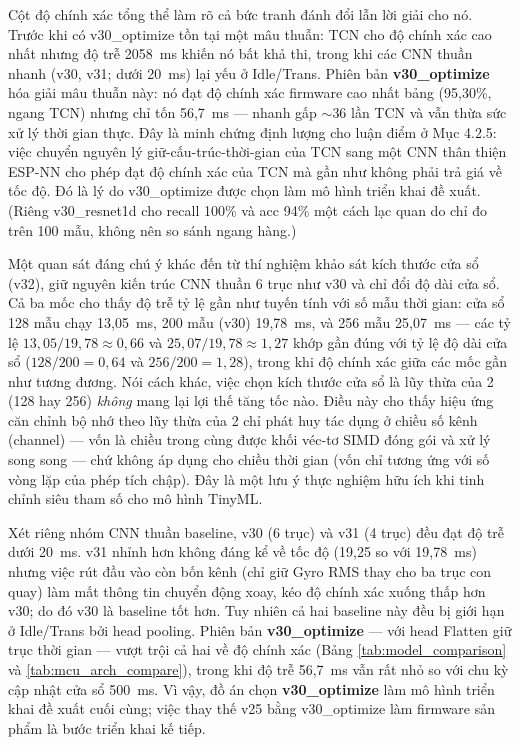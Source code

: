\documentclass[../DoAn.tex]{subfiles}
\begin{document}
Cột độ chính xác tổng thể làm rõ cả bức tranh đánh đổi lẫn lời giải cho nó. Trước khi có v30\_optimize tồn tại một mâu thuẫn: TCN cho độ chính xác cao nhất nhưng độ trễ 2058~ms khiến nó bất khả thi, trong khi các CNN thuần nhanh (v30, v31; dưới 20~ms) lại yếu ở Idle/Trans. Phiên bản \textbf{v30\_optimize} hóa giải mâu thuẫn này: nó đạt độ chính xác firmware cao nhất bảng (95,30\%, ngang TCN) nhưng chỉ tốn 56,7~ms --- nhanh gấp $\sim$36 lần TCN và vẫn thừa sức xử lý thời gian thực. Đây là minh chứng định lượng cho luận điểm ở Mục 4.2.5: việc chuyển nguyên lý giữ-cấu-trúc-thời-gian của TCN sang một CNN thân thiện ESP-NN cho phép đạt độ chính xác của TCN mà gần như không phải trả giá về tốc độ. Đó là lý do v30\_optimize được chọn làm mô hình triển khai đề xuất. (Riêng v30\_resnet1d cho recall 100\% và acc 94\% một cách lạc quan do chỉ đo trên 100 mẫu, không nên so sánh ngang hàng.)

Một quan sát đáng chú ý khác đến từ thí nghiệm khảo sát kích thước cửa sổ (v32), giữ nguyên kiến trúc CNN thuần 6 trục như v30 và chỉ đổi độ dài cửa sổ. Cả ba mốc cho thấy độ trễ tỷ lệ gần như tuyến tính với số mẫu thời gian: cửa sổ 128 mẫu chạy 13,05~ms, 200 mẫu (v30) 19,78~ms, và 256 mẫu 25,07~ms --- các tỷ lệ $13{,}05/19{,}78 \approx 0{,}66$ và $25{,}07/19{,}78 \approx 1{,}27$ khớp gần đúng với tỷ lệ độ dài cửa sổ ($128/200 = 0{,}64$ và $256/200 = 1{,}28$), trong khi độ chính xác giữa các mốc gần như tương đương. Nói cách khác, việc chọn kích thước cửa sổ là lũy thừa của 2 (128 hay 256) \textit{không} mang lại lợi thế tăng tốc nào. Điều này cho thấy hiệu ứng căn chỉnh bộ nhớ theo lũy thừa của 2 chỉ phát huy tác dụng ở chiều số kênh (channel) --- vốn là chiều trong cùng được khối véc-tơ SIMD đóng gói và xử lý song song --- chứ không áp dụng cho chiều thời gian (vốn chỉ tương ứng với số vòng lặp của phép tích chập). Đây là một lưu ý thực nghiệm hữu ích khi tinh chỉnh siêu tham số cho mô hình TinyML.

Xét riêng nhóm CNN thuần baseline, v30 (6 trục) và v31 (4 trục) đều đạt độ trễ dưới 20~ms. v31 nhỉnh hơn không đáng kể về tốc độ (19,25 so với 19,78~ms) nhưng việc rút đầu vào còn bốn kênh (chỉ giữ Gyro RMS thay cho ba trục con quay) làm mất thông tin chuyển động xoay, kéo độ chính xác xuống thấp hơn v30; do đó v30 là baseline tốt hơn. Tuy nhiên cả hai baseline này đều bị giới hạn ở Idle/Trans bởi head pooling. Phiên bản \textbf{v30\_optimize} --- với head Flatten giữ trục thời gian --- vượt trội cả hai về độ chính xác (Bảng \ref{tab:model_comparison} và \ref{tab:mcu_arch_compare}), trong khi độ trễ 56,7~ms vẫn rất nhỏ so với chu kỳ cập nhật cửa sổ 500~ms. Vì vậy, đồ án chọn \textbf{v30\_optimize} làm mô hình triển khai đề xuất cuối cùng; việc thay thế v25 bằng v30\_optimize làm firmware sản phẩm là bước triển khai kế tiếp.
\end{document}
